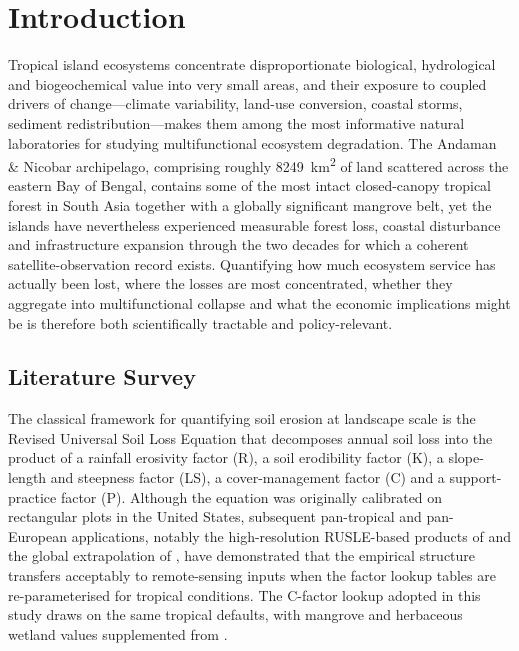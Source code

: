 \documentclass[12pt,a4paper]{article}
\begin{document}
\clearpage
\tableofcontents
\clearpage

\renewcommand{\listfigurename}{List of Figures}
\renewcommand{\listtablename}{List of Tables}
\listoffigures
{}
\bigskip
\listoftables
{}
\clearpage

\section{Introduction}

Tropical island ecosystems concentrate disproportionate biological,
hydrological and biogeochemical value into very small areas, and their
exposure to coupled drivers of change---climate variability, land-use
conversion, coastal storms, sediment redistribution---makes them among
the most informative natural laboratories for studying multifunctional
ecosystem degradation. The Andaman \& Nicobar archipelago, comprising
roughly \SI{8249}{\square\kilo\metre} of land scattered across the
eastern Bay of Bengal, contains some of the most intact closed-canopy
tropical forest in South Asia together with a globally significant
mangrove belt, yet the islands have nevertheless experienced
measurable forest loss, coastal disturbance and infrastructure
expansion through the two decades for which a coherent
satellite-observation record exists. Quantifying how much ecosystem
service has actually been lost, where the losses are most concentrated,
whether they aggregate into multifunctional collapse and what the
economic implications might be is therefore both scientifically
tractable and policy-relevant.

\subsection{Literature Survey}

The classical framework for quantifying soil erosion at landscape
scale is the Revised Universal Soil Loss Equation \citep{renard1997}
that decomposes annual soil loss into the product of a rainfall
erosivity factor (R), a soil erodibility factor (K), a slope-length
and steepness factor (LS), a cover-management factor (C) and a
support-practice factor (P). Although the equation was originally
calibrated on rectangular plots in the United States, subsequent
pan-tropical and pan-European applications, notably the high-resolution
RUSLE-based products of \citet{panagos2015} and the global
extrapolation of \citet{borrelli2020}, have demonstrated that the
empirical structure transfers acceptably to remote-sensing inputs when
the factor lookup tables are re-parameterised for tropical conditions.
The C-factor lookup adopted in this study draws on the same
\citet{borrelli2020} tropical defaults, with mangrove and herbaceous
wetland values supplemented from \citet{wischmeier1978}.
\end{document}
